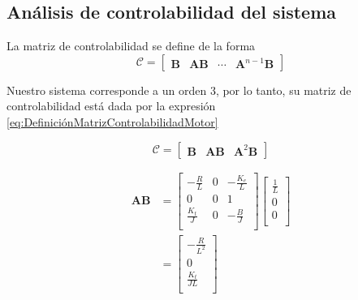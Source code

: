 
\subsection{Análisis de controlabilidad del sistema}
La matriz de controlabilidad se define de la forma
\begin{equation}
  \mathcal{C} = \begin{bmatrix}
    \mathbf{B} & \mathbf{A}\mathbf{B} & \cdots & \mathbf{A}^{n-1}\mathbf{B}
  \end{bmatrix} 
\end{equation}

Nuestro sistema corresponde a un orden 3, por lo tanto, su matriz de controlabilidad
está dada por la expresión \eqref{eq:DefiniciónMatrizControlabilidadMotor}

\begin{equation}
  \mathcal{C} = \begin{bmatrix}
    \mathbf{B} & \mathbf{A}\mathbf{B} & \mathbf{A}^{2}\mathbf{B}
  \end{bmatrix} 
  \label{eq:DefiniciónMatrizControlabilidadMotor}
\end{equation}

\begin{equation*}
  \begin{aligned}
    \mathbf{AB} &= 
    \begin{bmatrix}
      -\frac{R}{L}  & 0 & -\frac{K_e}{L} \\
      0             & 0 &  1             \\
      \frac{K_t}{J} & 0 & -\frac{B}{J}   \\
    \end{bmatrix}
    \begin{bmatrix}
      \frac{1}{L} \\
      0           \\
      0           \\
    \end{bmatrix} \\
     &= 
    \begin{bmatrix}
      -\frac{R}{L^2}  \\
      0               \\
      \frac{K_t}{JL}  \\
    \end{bmatrix}
  \end{aligned}
\end{equation*}

